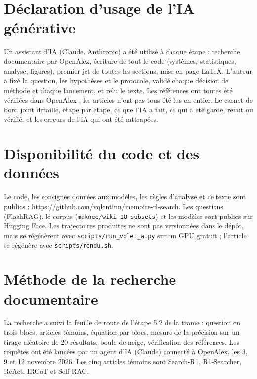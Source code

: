 \documentclass[11pt,a4paper]{article}
\begin{document}
\section*{Déclaration d'usage de l'IA générative}
Un assistant d'IA (Claude, Anthropic) a été utilisé à chaque étape : recherche documentaire par OpenAlex, écriture de tout le code (systèmes, statistiques, analyse, figures), premier jet de toutes les sections, mise en page LaTeX. L'auteur a fixé la question, les hypothèses et le protocole, validé chaque décision de méthode et chaque lancement, et relu le texte. Les références ont toutes été vérifiées dans OpenAlex ; les articles n'ont pas tous été lus en entier. Le carnet de bord joint détaille, étape par étape, ce que l'IA a fait, ce qui a été gardé, refait ou vérifié, et les erreurs de l'IA qui ont été rattrapées.

\section*{Disponibilité du code et des données}
Le code, les consignes données aux modèles, les règles d'analyse et ce texte sont publics : \url{https://github.com/vqlentinn/memoire-rl-search}. Les questions (FlashRAG), le corpus (\texttt{maknee/wiki-18-subsets}) et les modèles sont publics sur Hugging Face. Les trajectoires produites ne sont pas versionnées dans le dépôt, mais se régénèrent avec \texttt{scripts/run\_volet\_a.py} sur un GPU gratuit ; l'article se régénère avec \texttt{scripts/rendu.sh}.




\appendix
\section{Méthode de la recherche documentaire}\label{ann:requetes}

La recherche a suivi la feuille de route de l'étape 5.2 de la trame : question en trois blocs, articles témoins, équation par blocs, mesure de la précision sur un tirage aléatoire de 20 résultats, boule de neige, vérification des références. Les requêtes ont été lancées par un agent d'IA (Claude) connecté à OpenAlex, les 3, 9 et 12 novembre 2026. Les cinq articles témoins sont Search-R1, R1-Searcher, ReAct, IRCoT et Self-RAG.
\end{document}
